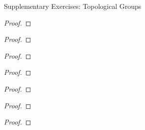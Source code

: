 \begin{section*}{Supplementary Exercises: Topological Groups}

    \begin{exercise}\label{chapter2:sectionX:exercise1}
    \end{exercise}

    \begin{proof}
    \end{proof}


    \begin{exercise}\label{chapter2:sectionX:exercise2}
    \end{exercise}

    \begin{proof}
    \end{proof}


    \begin{exercise}\label{chapter2:sectionX:exercise3}
    \end{exercise}

    \begin{proof}
    \end{proof}


    \begin{exercise}\label{chapter2:sectionX:exercise4}
    \end{exercise}

    \begin{proof}
    \end{proof}


    \begin{exercise}\label{chapter2:sectionX:exercise5}
    \end{exercise}

    \begin{proof}
    \end{proof}


    \begin{exercise}\label{chapter2:sectionX:exercise6}
    \end{exercise}

    \begin{proof}
    \end{proof}


    \begin{exercise}\label{chapter2:sectionX:exercise7}
    \end{exercise}

    \begin{proof}
    \end{proof}

\end{section*}
